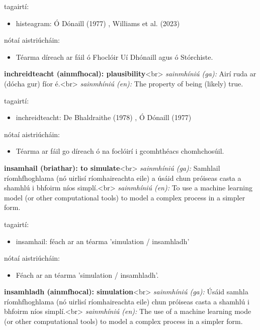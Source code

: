 \documentclass{article}
\begin{document}
tagairtí:
\begin{itemize}
	\item histeagram: Ó Dónaill (1977) \cite{odonaill}, Williams et al. (2023) \cite{storchiste}
\end{itemize}

nótaí aistriúcháin:
\begin{itemize}
	\item Téarma díreach ar fáil ó Fhoclóir Uí Dhónaill agus ó Stórchiste.
\end{itemize}


\textbf{inchreidteacht (ainmfhocal): plausibility}<br>
\textit{sainmhíniú (ga):} Airí ruda ar (dócha gur) fíor é.<br>
\textit{sainmhíniú (en):} The property of being (likely) true.

tagairtí:
\begin{itemize}
	\item inchreidteacht: De Bhaldraithe (1978) \cite{de-bhaldraithe}, Ó Dónaill (1977) \cite{odonaill}
\end{itemize}

nótaí aistriúcháin:
\begin{itemize}
	\item Téarma ar fáil go díreach ó na foclóirí i gcomhthéacs chomhchosúil.
\end{itemize}


\textbf{insamhail (briathar): to simulate}<br>
\textit{sainmhíniú (ga):} Samhlail ríomhfhoghlama (nó uirlisí ríomhaireachta eile) a úsáid chun próiseas casta a shamhlú i bhfoirm níos simplí.<br>
\textit{sainmhíniú (en):} To use a machine learning model (or other computational tools) to model a complex process in a simpler form.

tagairtí:
\begin{itemize}
	\item insamhail: féach ar an téarma 'simulation / insamhladh'
\end{itemize}

nótaí aistriúcháin:
\begin{itemize}
	\item Féach ar an téarma 'simulation / insamhladh'.
\end{itemize}


\textbf{insamhladh (ainmfhocal): simulation}<br>
\textit{sainmhíniú (ga):} Úsáid samhla ríomhfhoghlama (nó uirlisí ríomhaireachta eile) chun próiseas casta a shamhlú i bhfoirm níos simplí.<br>
\textit{sainmhíniú (en):} The use of a machine learning mode (or other computational tools) to model a complex process in a simpler form.
\end{document}
